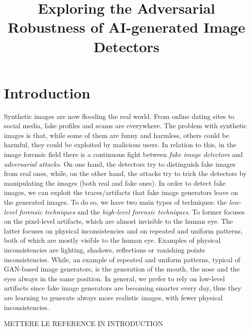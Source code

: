 \documentclass[conference]{IEEEtran} %
\begin{document}
\title{Exploring the Adversarial Robustness of AI-generated Image Detectors}

\author{
}

\maketitle

\begin{abstract}
\end{abstract}

\section{Introduction}
    Synthetic images are now flooding the real world. From online dating sites to social media, fake profiles and scams are everywhere. The problem with synthetic images is that, while some of them are funny and harmless, others could be harmful, they could be exploited by malicious users. In relation to this, in the image forensic field there is a continuous fight between \textit{fake image detectors} and \textit{adversarial attacks}. On one hand, the detectors try to distinguish fake images from real ones, while, on the other hand, the attacks try to trick the detectors by manipulating the images (both real and fake ones). In order to detect fake images, we can exploit the traces/artifacts that fake image generators leave on the generated images. To do so, we have two main types of techniques: the \textit{low-level forensic techniques} and the \textit{high-level forensic techniques}. To former focuses on the pixel-level artifacts, which are almost invisible to the human eye. The latter focuses on physical inconsistencies and on repeated and uniform patterns, both of which are mostly visible to the human eye. Examples of physical inconsistencies are lighting, shadows, reflections or vanishing points inconsistencies. While, an example of repeated and uniform patterns, typical of GAN-based image generators, is the generation of the mouth, the nose and the eyes always in the same position. In general, we prefer to rely on low-level artifacts since fake image generators are becoming smarter every day, thus they are learning to generate always more realistic images, with fewer physical inconsistencies.


    METTERE LE REFERENCE IN INTRODUCTION
\end{document}
